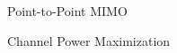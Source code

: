 \documentclass[journal]{IEEEtran}
\begin{document}
\begin{section}{Point-to-Point MIMO}
\begin{subsection}{Channel Power Maximization}
	\end{subsection}
\end{section}




\end{document}
